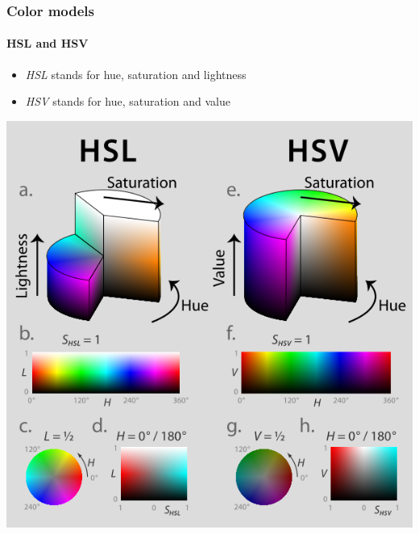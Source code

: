 \documentclass{beamer}
\begin{document}
\begin{frame}
\frametitle{Color models}
\framesubtitle{HSL and HSV}
\begin{itemize}
\item \textit{HSL} stands for hue, saturation and lightness
\item \textit{HSV} stands for hue, saturation and value
\end{itemize}
\begin{center}
\includegraphics[scale=0.26]{images/L6_HSLHSV1.png}
\end{center}
\end{frame}
\end{document}
